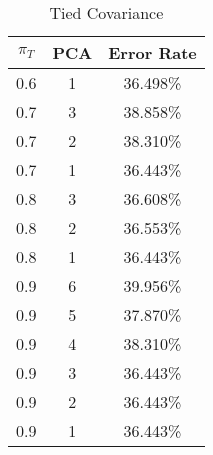 \begin{center}
\begin{longtable}{|c|c|c|}
\caption{Tied Covariance}\label{tab:mvg_tiedcov}\\
\hline
$\pi_T$ & PCA & Error Rate\\
\hline
0.6 & 1 & 36.498\% \\
\hline
0.7 & 3 & 38.858\% \\
\hline
0.7 & 2 & 38.310\% \\
\hline
0.7 & 1 & 36.443\% \\
\hline
0.8 & 3 & 36.608\% \\
\hline
0.8 & 2 & 36.553\% \\
\hline
0.8 & 1 & 36.443\% \\
\hline
0.9 & 6 & 39.956\% \\
\hline
0.9 & 5 & 37.870\% \\
\hline
0.9 & 4 & 38.310\% \\
\hline
0.9 & 3 & 36.443\% \\
\hline
0.9 & 2 & 36.443\% \\
\hline
0.9 & 1 & 36.443\% \\
\hline
\hline
\end{longtable}
\end{center}
